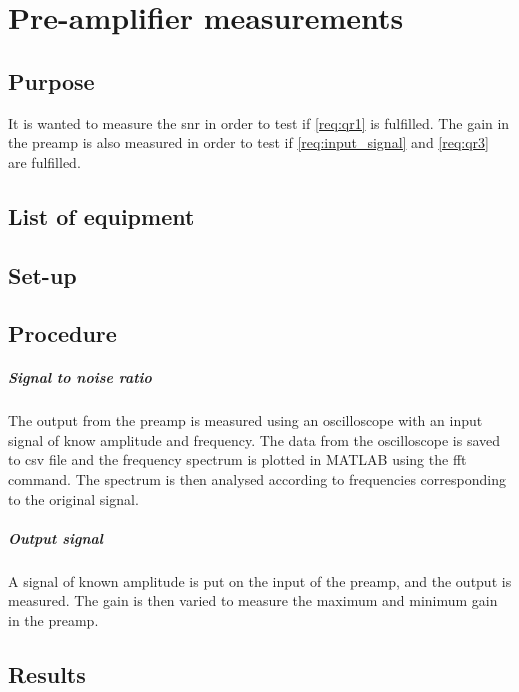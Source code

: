 \chapter{Pre-amplifier measurements}\label{pre_amp_meas_app} 
\section{Purpose}
It is wanted to measure the \gls{snr} in order to test if \autoref{req:qr1} is fulfilled. The gain in the \gls{preamp} is also measured in order to test if \autoref{req:input_signal} and \autoref{req:qr3} are fulfilled.

\section{List of equipment}

\section{Set-up}

\section{Procedure}
\paragraph{Signal to noise ratio}
The output from the \gls{preamp} is measured using an oscilloscope with an input signal of know amplitude and frequency. The data from the oscilloscope is saved to csv file and the frequency spectrum is plotted in MATLAB using the \gls{fft} command. The spectrum is then analysed according to frequencies corresponding to the original signal.
\paragraph{Output signal}
A signal of known amplitude is put on the input of the \gls{preamp}, and the output is measured. The gain is then varied to measure the maximum and minimum gain in the \gls{preamp}.



\section{Results}